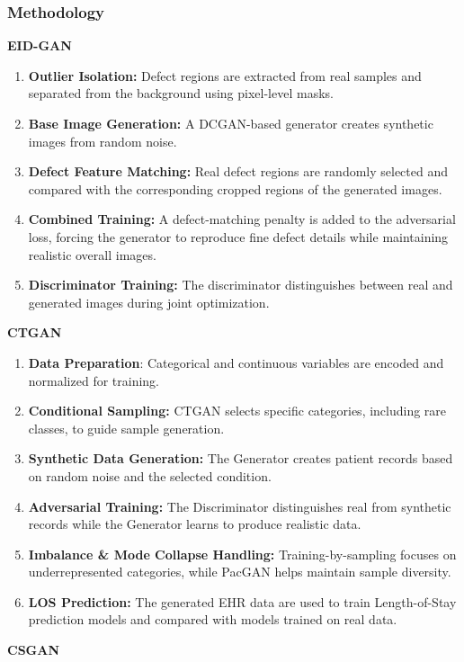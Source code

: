 \documentclass[12pt,a4paper]{article}
\begin{document}
\subsubsection{Methodology}
\textbf{EID-GAN}
\begin{enumerate}
    \item \textbf{Outlier Isolation:} Defect regions are extracted from real samples and separated from the background using pixel-level masks.
    \item \textbf{Base Image Generation:} A DCGAN-based generator creates synthetic images from random noise.
    \item \textbf{Defect Feature Matching:} Real defect regions are randomly selected and compared with the corresponding cropped regions of the generated images.
    \item \textbf{Combined Training:} A defect-matching penalty is added to the adversarial loss, forcing the generator to reproduce fine defect details while maintaining realistic overall images.
    \item \textbf{Discriminator Training:} The discriminator distinguishes between real and generated images during joint optimization.
\end{enumerate}
\textbf{CTGAN}
\begin{enumerate}
    \item \textbf{Data Preparation}: Categorical and continuous variables are encoded and normalized for training.
    \item \textbf{Conditional Sampling:} CTGAN selects specific categories, including rare classes, to guide sample generation.
    \item \textbf{Synthetic Data Generation:} The Generator creates patient records based on random noise and the selected condition.
    \item \textbf{Adversarial Training:} The Discriminator distinguishes real from synthetic records while the Generator learns to produce realistic data.
    \item \textbf{Imbalance \& Mode Collapse Handling:} Training-by-sampling focuses on underrepresented categories, while PacGAN helps maintain sample diversity.
    \item \textbf{LOS Prediction:} The generated EHR data are used to train Length-of-Stay prediction models and compared with models trained on real data.
\end{enumerate}
\textbf{CSGAN}
\end{document}
